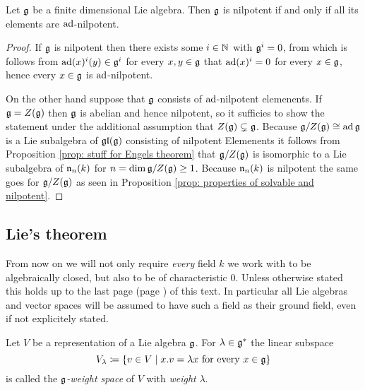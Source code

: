 \begin{thrm}[Engel]
 Let $\mathfrak{g}$ be a finite dimensional Lie algebra. Then $\mathfrak{g}$ is nilpotent if and only if all its elements are $\operatorname{ad}$-nilpotent.
\end{thrm}
\begin{proof}
 If $\mathfrak{g}$ is nilpotent then there exists some $i \in \mathbb{N}$ with $\mathfrak{g}^i = 0$, from which is follows from $\operatorname{ad}(x)^i(y) \in \mathfrak{g}^i$ for every $x,y \in \mathfrak{g}$ that $\operatorname{ad}(x)^i = 0$ for every $x \in \mathfrak{g}$, hence every $x \in \mathfrak{g}$ is $\operatorname{ad}$-nilpotent.
 
 On the other hand suppose that $\mathfrak{g}$ consists of $\operatorname{ad}$-nilpotent elemenents. If $\mathfrak{g} = Z(\mathfrak{g})$ then $\mathfrak{g}$ is abelian and hence nilpotent, so it sufficies to show the statement under the additional assumption that $Z(\mathfrak{g}) \subsetneq \mathfrak{g}$. Because $\mathfrak{g}/Z(\mathfrak{g}) \cong \operatorname{ad} \mathfrak{g}$ is a Lie subalgebra of $\mathfrak{gl}(\mathfrak{g})$ consisting of nilpotent Elemenents it follows from Proposition \ref{prop: stuff for Engels theorem} that $\mathfrak{g}/Z(\mathfrak{g})$ is isomorphic to a Lie subalgebra of $\mathfrak{n}_n(k)$ for $n = \dim \mathfrak{g}/Z(\mathfrak{g}) \geq 1$. Because $\mathfrak{n}_n(k)$ is nilpotent the same goes for $\mathfrak{g}/Z(\mathfrak{g})$ as seen in Proposition \ref{prop: properties of solvable and nilpotent}.
\end{proof}





\subsection{Lie’s theorem}


From now on we will not only require \emph{every} field $k$ we work with to be algebraically closed, but also to be of characteristic $0$. Unless otherwise stated this holds up to the last page (page \pageref{LastPage}) of this text. In particular all Lie algebras and vector spaces will be assumed to have such a field as their ground field, even if not explicitely stated.


\begin{defi}
 Let $V$ be a representation of a Lie algebra $\mathfrak{g}$. For $\lambda \in \mathfrak{g}^*$ the linear subspace
 \[
  V_\lambda \coloneqq \{v \in V \mid \text{$x.v = \lambda x$ for every $x \in \mathfrak{g}$}\}
 \]
 is called the \emph{$\mathfrak{g}$-weight space} of $V$ with \emph{weight} $\lambda$.
\end{defi}




